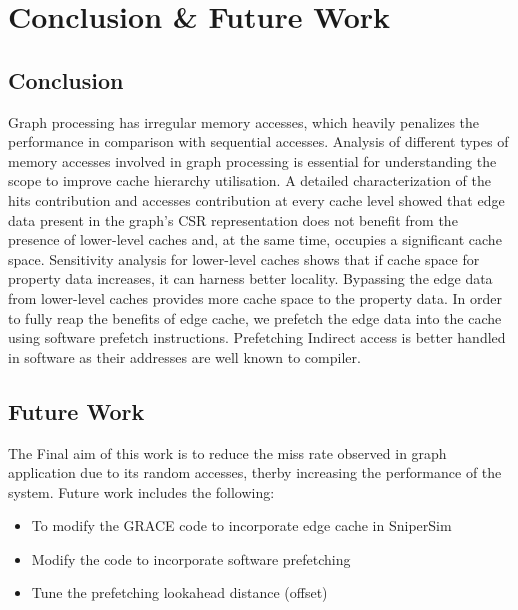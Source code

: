 \documentclass[a4paper,12pt, final]{report}
\begin{document}
\chapter{Conclusion \& Future Work}\label{chap:conclusion}
\section{Conclusion}
Graph processing has irregular memory accesses, which heavily penalizes the performance
in comparison with sequential accesses. Analysis of different types of memory accesses
involved in graph processing is essential for understanding the scope to improve cache
hierarchy utilisation. A detailed characterization of the hits contribution and accesses
contribution at every cache level showed that edge data present in the graph's CSR representation does not benefit from the presence of lower-level caches and, at the same time,
occupies a significant cache space. Sensitivity analysis for lower-level caches shows that
if cache space for property data increases, it can harness better locality. Bypassing the
edge data from lower-level caches provides more cache space to the property data. In order to fully reap the benefits of edge cache, we prefetch the edge data into the cache using software prefetch instructions.
Prefetching Indirect access is better handled in software as their addresses are well known to compiler.




\section{Future Work}
The Final aim of this work is to reduce the miss rate observed in graph application due to its random accesses, therby increasing the performance of the system. 
Future work includes the following:
\begin{itemize}
    \setlength\itemsep{0 em}
    \item To modify the GRACE code to incorporate edge cache in SniperSim
    \item Modify the code to incorporate software prefetching
    \item Tune the prefetching lookahead distance (offset)
\end{itemize}




{}
\end{document}
